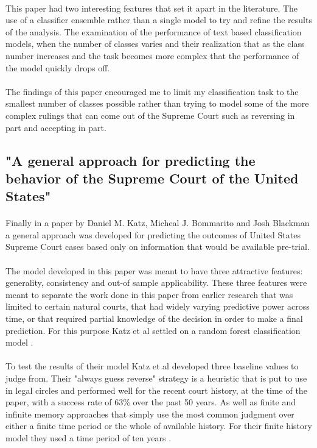 \documentclass[12pt,english]{article}
\begin{document}
\paragraph{}
This paper had two interesting features that set it apart in the literature. The use of a classifier ensemble rather than a single model to try and refine the results of the analysis. The examination of the performance of text based classification models, when the number of classes varies and their realization that as the class number increases and the task becomes more complex that the performance of the model quickly drops off. 
\paragraph{}
The findings of this paper encouraged me to limit my classification task to the smallest number of classes possible rather than trying to model some of the more complex rulings that can come out of the Supreme Court such as reversing in part and accepting in part. 
\subsection{"A general approach for predicting the behavior of the Supreme Court of the United States"}
\paragraph{}
Finally in a  paper by Daniel M. Katz, Micheal J. Bommarito and Josh Blackman a general approach was developed for predicting the outcomes of United States Supreme Court cases based only on information that would be available pre-trial. 
\paragraph{}
The model developed in this paper was meant to have three attractive features: generality, consistency and out-of sample applicability. These three features were meant to separate the work done in this paper from earlier research that was limited to certain natural courts, that had widely varying predictive power across time, or that required partial knowledge of the decision in order to make a final prediction. For this purpose Katz et al settled on a random forest classification model \citep{katz_general_2017}.
\paragraph{}
To test the results of their model Katz et al developed three baseline values to judge from. Their "always guess reverse" \citep{katz_general_2017} strategy is a heuristic that is put to use in legal circles and performed well for the recent court history, at the time of the paper, with a success rate of 63\% over the past 50 years. As well as finite and infinite memory approaches that simply use the most common judgment over either a finite time period or the whole of available history. For their finite history model they used a time period of ten years \citep{katz_general_2017}.
\end{document}
